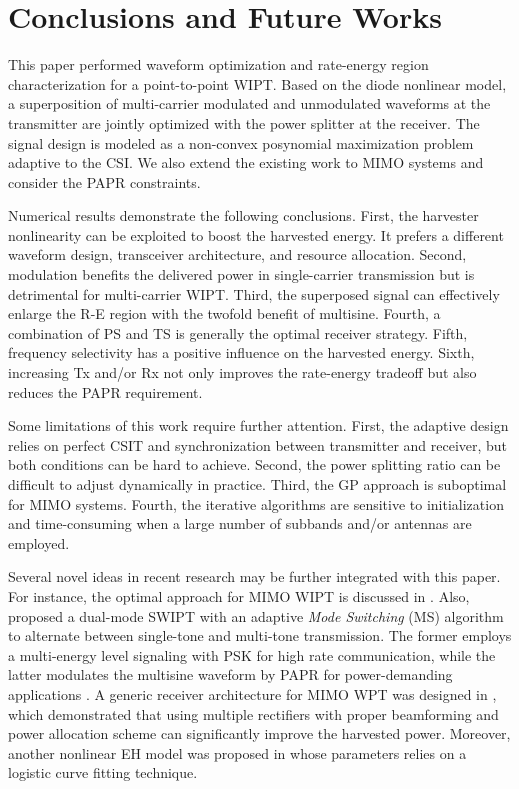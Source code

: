 \chapter{Conclusions and Future Works}
This paper performed waveform optimization and rate-energy region characterization for a point-to-point WIPT. Based on the diode nonlinear model, a superposition of multi-carrier modulated and unmodulated waveforms at the transmitter are jointly optimized with the power splitter at the receiver. The signal design is modeled as a non-convex posynomial maximization problem adaptive to the CSI. We also extend the existing work to MIMO systems and consider the PAPR constraints.

Numerical results demonstrate the following conclusions. First, the harvester nonlinearity can be exploited to boost the harvested energy. It prefers a different waveform design, transceiver architecture, and resource allocation. Second, modulation benefits the delivered power in single-carrier transmission but is detrimental for multi-carrier WIPT. Third, the superposed signal can effectively enlarge the R-E region with the twofold benefit of multisine. Fourth, a combination of PS and TS is generally the optimal receiver strategy. Fifth, frequency selectivity has a positive influence on the harvested energy. Sixth, increasing Tx and/or Rx not only improves the rate-energy tradeoff but also reduces the PAPR requirement.

Some limitations of this work require further attention. First, the adaptive design relies on perfect CSIT and synchronization between transmitter and receiver, but both conditions can be hard to achieve. Second, the power splitting ratio can be difficult to adjust dynamically in practice. Third, the GP approach is suboptimal for MIMO systems. Fourth, the iterative algorithms are sensitive to initialization and time-consuming when a large number of subbands and/or antennas are employed.

Several novel ideas in recent research may be further integrated with this paper. For instance, the optimal approach for MIMO WIPT is discussed in \cite{Huang2017}. Also, \cite{Park2018} proposed a dual-mode SWIPT with an adaptive \textit{Mode Switching} (MS) algorithm to alternate between single-tone and multi-tone transmission. The former employs a multi-energy level signaling with PSK for high rate communication, while the latter modulates the multisine waveform by PAPR for power-demanding applications \cite{Krikidis2019}. A generic receiver architecture for MIMO WPT was designed in \cite{Ma2019}, which demonstrated that using multiple rectifiers with proper beamforming and power allocation scheme can significantly improve the harvested power. Moreover, another nonlinear EH model was proposed in \cite{Boshkovska2015} whose parameters relies on a logistic curve fitting technique. 